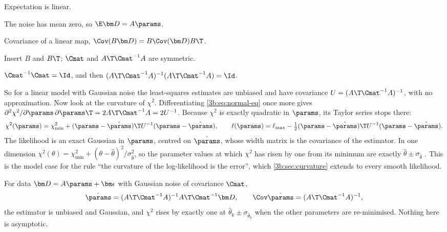 \begin{explain}
  \item Expectation is linear.
  \item The noise has mean zero, so $\E\bm D=A\params$.
  \item Covariance of a linear map, $\Cov(B\bm D)=B\Cov(\bm D)B\T$.
  \item Insert $B$ and $B\T$; $\Cmat$ and $A\T\Cmat^{-1}A$ are symmetric.
  \item $\Cmat^{-1}\Cmat=\Id$, and then
        $(A\T\Cmat^{-1}A)^{-1}(A\T\Cmat^{-1}A)=\Id$.
\end{explain}
So for a linear model with Gaussian noise the least-squares estimates are
unbiased and have covariance $U=(A\T\Cmat^{-1}A)^{-1}$, with no
approximation. Now look at the curvature of $\chi^2$. Differentiating
\eqref{3b:eq:normal-eq} once more gives
$\partial^2\chi^2/\partial\params\,\partial\params\T=2A\T\Cmat^{-1}A=2U^{-1}$.
Because $\chi^2$ is exactly quadratic in $\params$, its Taylor series stops
there:
\begin{equation}
  \chi^2(\params)=\chi^2_{\min}+(\params-\hat\params)\T U^{-1}(\params-\hat\params),
  \qquad
  \ell(\params)=\ell_{\max}-\tfrac12(\params-\hat\params)\T U^{-1}(\params-\hat\params).
  \label{3b:eq:chi2-quadratic}
\end{equation}
The likelihood is an exact Gaussian in $\params$, centred on $\hat\params$,
whose width matrix is the covariance of the estimator. In one dimension
$\chi^2(\theta)=\chi^2_{\min}+(\theta-\hat\theta)^2/\sigma_{\hat\theta}^2$,
so the parameter values at which $\chi^2$ has risen by one from its minimum
are exactly $\hat\theta\pm\sigma_{\hat\theta}$ .
This is the model case for the rule ``the curvature of the log-likelihood is
the error'', which \cref{3b:sec:curvature} extends to every smooth
likelihood.

\begin{keyidea}
For data $\bm D=A\params+\bm\epsilon$ with Gaussian noise of covariance
$\Cmat$,
\[
  \hat\params=(A\T\Cmat^{-1}A)^{-1}A\T\Cmat^{-1}\bm D,\qquad
  \Cov\hat\params=(A\T\Cmat^{-1}A)^{-1},
\]
the estimator is unbiased and Gaussian, and $\chi^2$ rises by exactly one at
$\hat\theta_k\pm\sigma_{\hat\theta_k}$ when the other parameters are
re-minimised. Nothing here is asymptotic.
\end{keyidea}

